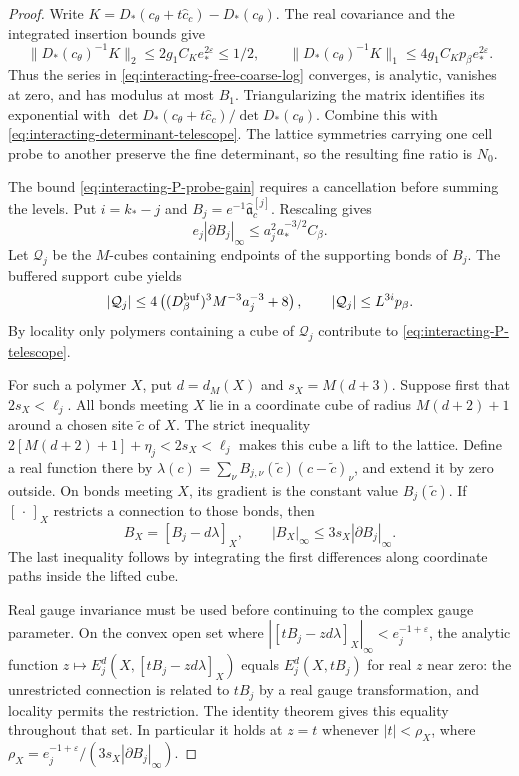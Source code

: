 \documentclass[11pt,letterpaper,reqno]{amsart}
\begin{document}
\begin{proof}
Write $K=D_*(c_\theta+t\widehat c_c)-D_*(c_\theta)$.
The real covariance and the integrated insertion
bounds give
\[
 \|D_*(c_\theta)^{-1}K\|_2\le
           2g_1C_Ke_*^{2\varepsilon}\le1/2,\qquad
 \|D_*(c_\theta)^{-1}K\|_1
           \le4g_1C_Kp_\beta e_*^{2\varepsilon}.
\]
Thus the series in \eqref{eq:interacting-free-coarse-log}
converges, is analytic, vanishes at zero, and
has modulus at most $B_1$. Triangularizing
the matrix identifies its exponential with
$\det D_*(c_\theta+t\widehat c_c)/\det D_*(c_\theta)$.
Combine this with
\eqref{eq:interacting-determinant-telescope}.
The lattice symmetries carrying one cell
probe to another preserve the fine determinant,
so the resulting fine ratio is $N_0$.

The bound \eqref{eq:interacting-P-probe-gain}
requires a cancellation before summing the levels.
Put $i=k_*-j$ and $B_j=e^{-1}\widehat{\mathfrak a}_c^{[j]}$.
Rescaling gives
\begin{equation}\label{eq:interacting-probe-derivative}
 e_j|\partial B_j|_\infty\le
                         a_j^2a_*^{-3/2}C_\beta .
\end{equation}
Let $\mathcal Q_j$ be the $M$-cubes containing
endpoints of the supporting bonds of $B_j$.
The buffered support cube yields
\begin{equation}\label{eq:interacting-probe-cube-count}
 |\mathcal Q_j|\le
 4\left((D_\beta^{\rm buf})^3M^{-3}a_j^{-3}+8\right),
 \qquad |\mathcal Q_j|\le L^{3i}p_\beta .
\end{equation}
By locality only polymers containing a cube
of $\mathcal Q_j$ contribute to
\eqref{eq:interacting-P-telescope}.

For such a polymer $X$, put $d=d_M(X)$ and
$s_X=M(d+3)$. Suppose first that $2s_X<\ell_j$.
All bonds meeting $X$ lie in a coordinate
cube of radius $M(d+2)+1$ around a chosen
site $\tilde c$ of $X$. The strict inequality
$2[M(d+2)+1]+\eta_j<2s_X<\ell_j$
makes this cube a lift to the lattice.
Define a real function there by
$\lambda(c)=\sum_\nu B_{j,\nu}(\tilde c)(c-\tilde c)_\nu$,
and extend it by zero outside. On bonds meeting
$X$, its gradient is the constant value
$B_j(\tilde c)$. If $[\,\cdot\,]_X$ restricts
a connection to those bonds, then
\[
 B_X=[B_j-d\lambda]_X,\qquad
 |B_X|_\infty\le3s_X|\partial B_j|_\infty.
\]
The last inequality follows by integrating
the first differences along coordinate paths
inside the lifted cube.

Real gauge invariance must be used before
continuing to the complex gauge parameter.
On the convex open set where
$|[tB_j-zd\lambda]_X|_\infty<e_j^{-1+\varepsilon}$,
the analytic function
$z\mapsto E_j^d(X,[tB_j-zd\lambda]_X)$
equals $E_j^d(X,tB_j)$ for real $z$ near zero:
the unrestricted connection is related to
$tB_j$ by a real gauge transformation, and
locality permits the restriction. The identity
theorem gives this equality throughout that
set. In particular it holds at $z=t$
whenever $|t|<\rho_X$, where
$\rho_X=e_j^{-1+\varepsilon}/(3s_X|\partial B_j|_\infty)$.


\end{proof}
\end{document}
